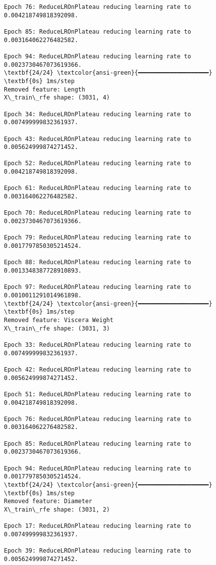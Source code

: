 \documentclass[11pt]{article}
\begin{document}
\begin{Verbatim}[commandchars=\\\{\}]
Epoch 76: ReduceLROnPlateau reducing learning rate to 0.004218749818392098.

Epoch 85: ReduceLROnPlateau reducing learning rate to 0.003164062276482582.

Epoch 94: ReduceLROnPlateau reducing learning rate to 0.0023730467073619366.
\textbf{24/24} \textcolor{ansi-green}{━━━━━━━━━━━━━━━━━━━━} \textbf{0s} 1ms/step
Removed feature: Length
X\_train\_rfe shape: (3031, 4)

Epoch 34: ReduceLROnPlateau reducing learning rate to 0.007499999832361937.

Epoch 43: ReduceLROnPlateau reducing learning rate to 0.005624999874271452.

Epoch 52: ReduceLROnPlateau reducing learning rate to 0.004218749818392098.

Epoch 61: ReduceLROnPlateau reducing learning rate to 0.003164062276482582.

Epoch 70: ReduceLROnPlateau reducing learning rate to 0.0023730467073619366.

Epoch 79: ReduceLROnPlateau reducing learning rate to 0.0017797850305214524.

Epoch 88: ReduceLROnPlateau reducing learning rate to 0.0013348387728910893.

Epoch 97: ReduceLROnPlateau reducing learning rate to 0.0010011291014961898.
\textbf{24/24} \textcolor{ansi-green}{━━━━━━━━━━━━━━━━━━━━} \textbf{0s} 1ms/step
Removed feature: Viscera Weight
X\_train\_rfe shape: (3031, 3)

Epoch 33: ReduceLROnPlateau reducing learning rate to 0.007499999832361937.

Epoch 42: ReduceLROnPlateau reducing learning rate to 0.005624999874271452.

Epoch 51: ReduceLROnPlateau reducing learning rate to 0.004218749818392098.

Epoch 76: ReduceLROnPlateau reducing learning rate to 0.003164062276482582.

Epoch 85: ReduceLROnPlateau reducing learning rate to 0.0023730467073619366.

Epoch 94: ReduceLROnPlateau reducing learning rate to 0.0017797850305214524.
\textbf{24/24} \textcolor{ansi-green}{━━━━━━━━━━━━━━━━━━━━} \textbf{0s} 1ms/step
Removed feature: Diameter
X\_train\_rfe shape: (3031, 2)

Epoch 17: ReduceLROnPlateau reducing learning rate to 0.007499999832361937.

Epoch 39: ReduceLROnPlateau reducing learning rate to 0.005624999874271452.


\end{Verbatim}
\end{document}
